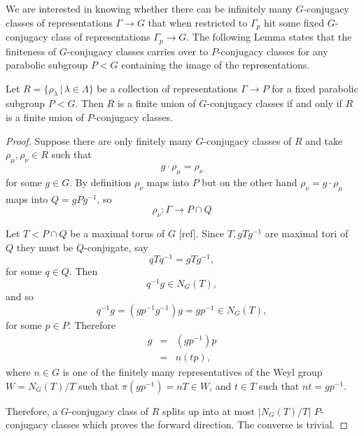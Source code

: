 We are interested in knowing whether there can be infinitely many $G$-conjugacy classes of representations $\Gamma\rightarrow G$ that when restricted to $\Gamma_p$ hit some fixed $G$-conjugacy class of representations $\Gamma_p\rightarrow G$. The following Lemma states that the finiteness of $G$-conjugacy classes carries over to $P$-conjugacy classes for any parabolic subgroup $P<G$ containing the image of the representations.

\begin{lemma}\label{GIsPConj} Let $R=\{\rho_\lambda\, |\, \lambda \in \Lambda\}$ be a collection of representations $\Gamma\rightarrow P$ for a fixed parabolic subgroup $P<G$. Then $R$ is a finite union of $G$-conjugacy classes if and only if $R$ is a finite union of $P$-conjugacy classes.
\end{lemma}
\begin{proof}
	Suppose there are only finitely many $G$-conjugacy classes of $R$ and take $\rho_\mu, \rho_\nu \in R$ such that
	\begin{displaymath}
		g\cdot \rho_\mu = \rho_\nu
	\end{displaymath}
	for some $g \in G$. By definition $\rho_\nu$ maps into $P$ but on the other hand $\rho_\nu = g\cdot \rho_\mu$ maps into $Q = gPg^{-1}$, so 
	\begin{displaymath}
		\rho_\nu: \Gamma\rightarrow P \cap Q
	\end{displaymath}
	
	Let $T < P \cap Q$ be a maximal torus of $G$ [ref]. Since $T,gTg^{-1}$ are maximal tori of $Q$ they must be $Q$-conjugate, say
	\begin{displaymath}
		qTq^{-1} = gTg^{-1},
	\end{displaymath}
	for some $q \in Q$. Then 
	\begin{displaymath}
		q^{-1}g \in N_G(T),
	\end{displaymath}
	and so
	\begin{displaymath}
		q^{-1}g = (gp^{-1}g^{-1})g = gp^{-1} \in N_G(T),
	\end{displaymath}
	for some $p \in P$. Therefore
	\begin{eqnarray*}
		g &=& (gp^{-1})p\\
		&=& n(tp),
	\end{eqnarray*}
	where $n\in G$ is one of the finitely many representatives of the Weyl group $W=N_G(T)/T$ such that $\pi(gp^{-1}) = nT\in W$, and $t\in T$ such that $nt = gp^{-1}$.
	
	Therefore, a $G$-conjugacy class of $R$ splits up into at most $|N_G(T)/T|$ $P$-conjugacy classes which proves the forward direction. The converse is trivial.
\end{proof}

